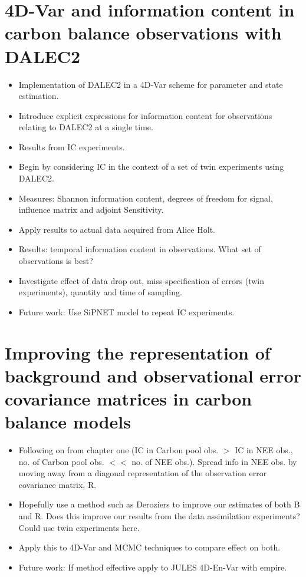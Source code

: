 \documentclass[11pt]{article}
\begin{document}
\section{4D-Var and information content in carbon balance observations with DALEC2}
\begin{itemize}
\item Implementation of DALEC2 in a 4D-Var scheme for parameter and state estimation. 
\item Introduce explicit expressions for information content for observations relating to DALEC2 at a single time.
\item Results from IC experiments.
\item Begin by considering IC in the context of a set of twin experiments using DALEC2.
\item Measures: Shannon information content, degrees of freedom for signal, influence matrix and adjoint Sensitivity.
\item Apply results to actual data acquired from Alice Holt.
\item Results: temporal information content in observations. What set of observations is best?
\item Investigate effect of data drop out, miss-specification of errors (twin experiments), quantity and time of sampling.
\item Future work: Use SiPNET model to repeat IC experiments.
\end{itemize}


\section{Improving the representation of background and observational error covariance matrices in carbon balance models} 
\begin{itemize}
\item Following on from chapter one (IC in Carbon pool obs. $>$ IC in NEE obs., no. of Carbon pool obs. $<<$ no. of NEE obs.). Spread info in NEE obs. by moving away from a diagonal representation of the observation error covariance matrix, R.
\item Hopefully use a method such as Deroziers to improve our estimates of both B and R. Does this improve our results from the data assimilation experiments? Could use twin experiments here.
\item Apply this to 4D-Var and MCMC techniques to compare effect on both.
\item Future work: If method effective apply to JULES 4D-En-Var with empire.
\end{itemize}
\end{document}
